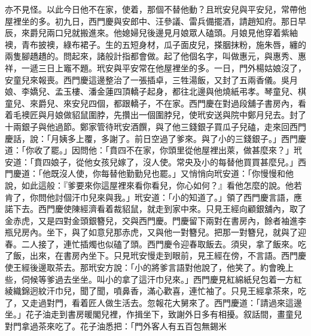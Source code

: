 \begin{showcontents}{}
亦不見怪。以此今日他不在家，使着，那個不替他動？且玳安兒與平安兒，常帶他屋裡坐的多。初九日，西門慶與安郎中、汪參議、雷兵備擺酒，請趙知府。那日早辰，來爵兒兩口兒就搬進來。他媳婦兒後邊見月娘眾人磕頭。月娘見他穿着紫紬襖，青布披襖，綠布裙子。生的五短身材，瓜子面皮兒，搽胭抹粉，施朱唇，纏的兩隻腳趫趫的。問起來，諸般計指都會做。起了他個名字，叫做惠元，與惠秀、惠祥，一遞三日上竈不題。玳安與平安常在他屋裡坐的多。一日，門外楊姑娘沒了，安童兒來報喪。西門慶這邊整治了一張插卓，三牲湯飯，又封了五兩香儀。吳月娘、李嬌兒、孟玉樓、潘金蓮四頂轎子起身，都往北邊與他燒紙弔孝。琴童兒、棋童兒、來爵兒、來安兒四個，都跟轎子，不在家。西門慶在對過段舖子書房內，看着毛襖匠與月娘做貂鼠圍脖，先攢出一個圍脖兒，使玳安送與院中鄭月兒去。封了十兩銀子與他過節。鄭家管待玳安酒饌，與了他三錢銀子買瓜子兒磕，走來回西門慶話，說：「月姨多上覆，多謝了。前日空過了爹來。與了小的三錢銀子。」西門慶道：「你收了罷。」因問他：「賁四不在家，你頭里從他屋裡出萊，做甚麼來？」玳安道：「賁四娘子，從他女孩兒嫁了，沒人使。常央及小的每替他買買甚麼兒。」西門慶道：「他既沒人使，你每替他勤勤兒也罷。」又悄悄向玳安道：「你慢慢和他說，如此這般：『爹要來你這屋裡來看你看兒，你心如何？』看他怎麼的說。他若肯了，你問他討個汗巾兒來與我。」玳安道：「小的知道了。」領了西門慶言語，應諾下去。西門慶使陳經濟看着裁貂鼠，就走到家中來。只見王經向顧銀舖內，取了金赤虎，又是四對金頭銀簪兒，交與西門慶。門慶留下兩對在書房內，餘者袖進李瓶兒房內。坐下，與了如意兒那赤虎，又與他一對簪兒。把那一對簪兒，就與了迎春。二人接了，連忙插燭也似磕了頭。西門慶令迎春取飯去。須臾，拿了飯來。吃了飯，出來，在書房內坐下。只見玳安慢走到眼前，見王經在傍，不言語。西門慶使王經後邊取茶去。那玳安方說：「小的將爹言語對他說了，他笑了。約會晚上些，伺候等爹過去坐坐。叫小的拿了這汗巾兒來。」西門慶見紅綿紙兒包着一方紅綾織錦迥紋汗巾兒，聞了聞，噴鼻香，滿心歡喜，連忙袖了。只見王經拿茶來，吃了，又走過對門，看着匠人做生活去。忽報花大舅來了。西門慶道：「請過來這邊坐。」花子油走到書房暖閣兒裡，作揖坐下，致謝外日多有相擾。叙話間，畫童兒對門拿過茶來吃了。花子油悉把：「門外客人有五百包無錫米 
\end{showcontents}
